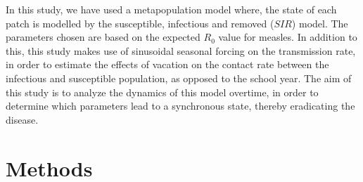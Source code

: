 \documentclass[twocolumn,nofootinbib,showkeys,twoside,floatfix,unsortedaddress,flushbottom,10pt,aps,pra]{report}
\begin{document}
\par
\smallskip \qquad
In this study, we have used a metapopulation model where, the state of each patch is modelled by the susceptible, infectious and removed ($SIR$) model. The parameters chosen are based on the expected $R_0$ value for measles.  In addition to this, this study makes use of sinusoidal seasonal forcing on the transmission rate, in order to estimate the effects of vacation on the contact rate between the infectious and susceptible population, as opposed to the school year. The aim of this study is to analyze the dynamics of this model overtime, in order to determine which parameters lead to a synchronous state, thereby eradicating the disease. \par
\smallskip

\section{Methods}
\end{document}
